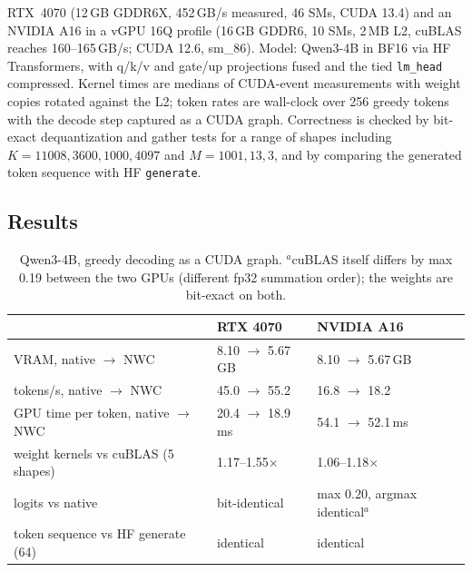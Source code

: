 \documentclass[11pt]{article}
\begin{document}
RTX~4070 (12\,GB GDDR6X, 452\,GB/s measured, 46 SMs, CUDA 13.4) and an NVIDIA A16 in a vGPU 16Q profile
(16\,GB GDDR6, 10 SMs, 2\,MB L2, cuBLAS reaches 160--165\,GB/s; CUDA 12.6, sm\_86). Model: Qwen3-4B in BF16
via HF Transformers, with q/k/v and gate/up projections fused and the tied \texttt{lm\_head} compressed.
Kernel times are medians of CUDA-event measurements with weight copies rotated against the L2; token
rates are wall-clock over 256 greedy tokens with the decode step captured as a CUDA graph. Correctness is
checked by bit-exact dequantization and gather tests for a range of shapes including $K = 11008, 3600,
1000, 4097$ and $M = 1001, 13, 3$, and by comparing the generated token sequence with HF
\texttt{generate}.

\subsection{Results}

\begin{table}[h]\centering
\begin{tabular}{lll}\toprule
 & RTX 4070 & NVIDIA A16 \\\midrule
VRAM, native $\rightarrow$ NWC & 8.10 $\rightarrow$ 5.67\,GB & 8.10 $\rightarrow$ 5.67\,GB \\
tokens/s, native $\rightarrow$ NWC & 45.0 $\rightarrow$ 55.2 & 16.8 $\rightarrow$ 18.2 \\
GPU time per token, native $\rightarrow$ NWC & 20.4 $\rightarrow$ 18.9\,ms & 54.1 $\rightarrow$ 52.1\,ms \\
weight kernels vs cuBLAS (5 shapes) & 1.17--1.55$\times$ & 1.06--1.18$\times$ \\
logits vs native & bit-identical & max 0.20, argmax identical$^{a}$ \\
token sequence vs HF generate (64) & identical & identical \\\bottomrule
\end{tabular}
\caption{Qwen3-4B, greedy decoding as a CUDA graph. $^{a}$cuBLAS itself differs by max 0.19 between the
two GPUs (different fp32 summation order); the weights are bit-exact on both.}
\end{table}
\end{document}
